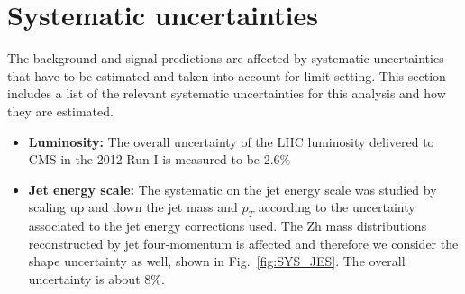 
\section{Systematic uncertainties}
The background and signal predictions are affected by systematic uncertainties that have to be estimated and taken into account for limit setting. This section includes a list of the relevant systematic uncertainties for this analysis and how they are estimated.

\begin{itemize}
\item \textbf{Luminosity:} The overall uncertainty of the LHC luminosity delivered to CMS in the 2012 Run-I is measured to be 2.6\%\cite{lumi}
\item \textbf{Jet energy scale:} The systematic on the jet energy scale was studied by scaling up and down the jet mass and $p_{T}$ according to the uncertainty associated to the jet energy corrections used. The Zh mass distributions reconstructed by jet four-momentum is affected and therefore we consider the shape uncertainty as well, shown in Fig.~\ref{fig:SYS_JES}. The overall uncertainty is about 8\%.
\end{itemize}

